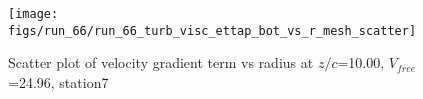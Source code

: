 \begin{figure}[H]
\centering
\texttt{[image: figs/run\_66/run\_66\_turb\_visc\_ettap\_bot\_vs\_r\_mesh\_scatter]}
\caption{Scatter plot of velocity gradient term vs radius at $z/c$=10.00, $V_{free}$=24.96, station7}
\label{fig:run_66_turb_visc_ettap_bot_vs_r_mesh_scatter}
\end{figure}


